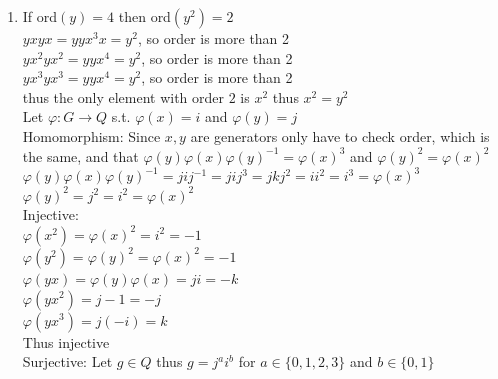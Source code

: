 \documentclass[12pt, letterpaper]{article}
\theoremstyle{definition}
\begin{document}
\begin{enumerate}[(a)]
\begin{enumerate}[1.]
        $\varphi(x^2)=a^2$\\
        $\varphi(y^2)=b^2$\\
        $\varphi(yx)=\varphi(y)\varphi(x)=ba$\\
        $\varphi(yx^2)=ba^2$\\
        $\varphi(yx^3)=ba^3$\\
        Thus injective\\
        Surjective: Let $g \in D_4$\\
        Thus $g=b^ja^i$  for $i \in \{0,1,2,3\}$ and $j \in \{0,1,2,3\}$\\
        Consider $y^jx^i$\\
        $\varphi(y^jx^i)=\varphi(y^j)\varphi(x^i)=\varphi(y)^j\varphi(x)^i=b^ja^i$ thus surjective\\
        Thus $\varphi$ is an isomorphism thus $G \cong D_4$
        \item If ord$(y)=4$ then ord$(y^2)=2$\\
        $yxyx=yyx^3x=y^2$, so order is more than 2\\
        $yx^2yx^2=yyx^4=y^2$, so order is more than 2\\
        $yx^3yx^3=yyx^4=y^2$, so order is more than 2\\
        thus the only element with order $2$ is $x^2$ thus $x^2=y^2$\\
        Let $\varphi : G \rightarrow Q$ s.t. $\varphi(x)=i$ and $\varphi(y)=j$\\
        Homomorphism: Since $x,y$ are generators only have to check order, which is the same, and that $\varphi(y)\varphi(x)\varphi(y)^{-1}=\varphi(x)^3$ and $\varphi(y)^2=\varphi(x)^2$\\
        $\varphi(y)\varphi(x)\varphi(y)^{-1}=jij^{-1}=jij^3=jkj^2=ii^2=i^3=\varphi(x)^3$\\
        $\varphi(y)^2=j^2=i^2=\varphi(x)^2$\\
        Injective:\\
        $\varphi(x^2)=\varphi(x)^2=i^2=-1$\\
        $\varphi(y^2)=\varphi(y)^2=\varphi(x)^2=-1$\\
        $\varphi(yx)=\varphi(y)\varphi(x)=ji=-k$\\
        $\varphi(yx^2)=j-1=-j$\\
        $\varphi(yx^3)=j(-i)=k$\\
        Thus injective\\
        Surjective: Let $g \in Q$ thus $g=j^ai^b$ for $a \in \{0,1,2,3\}$ and $b \in \{0,1\}$\\

\end{enumerate}
\end{enumerate}
\end{document}
